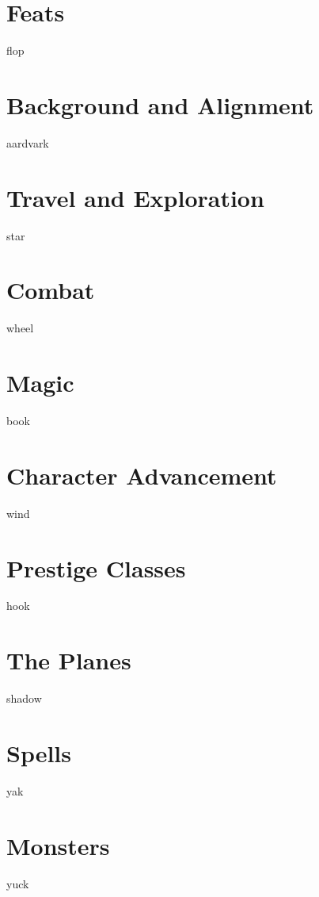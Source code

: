 \documentclass[12pt,twoside,onecolumn,openany,final]{memoir}
\begin{document}
\chapter{Feats}
flop
\chapter{Background and Alignment}
aardvark



\chapter{Travel and Exploration}
star
\chapter{Combat}
wheel
\chapter{Magic}
book
\chapter{Character Advancement}
wind
\chapter{Prestige Classes}
hook



\chapter{The Planes}
shadow


\appendix
\appendixpage

\makeatletter
\renewcommand{\@makechapterhead}[1]{%
\vspace*{0 pt}{
\raggedright \normalfont \fontsize{32}{32} \selectfont \bfseries
\ifnum \value{secnumdepth}>-1
  \if@mainmatter \vspace{-8pt} {\fontsize{20}{20} \selectfont Appendix \thechapter:}\\[8pt]
  \fi%
\fi
\hspace{0.65cm} #1\par\nobreak\vspace{20 pt}
}}
\makeatother

\clearpage


\chapter{Spells}
yak
\chapter{Monsters}
yuck




\clearpage
{}
\listoftables

\clearpage
{}
\printindex
\end{document}
